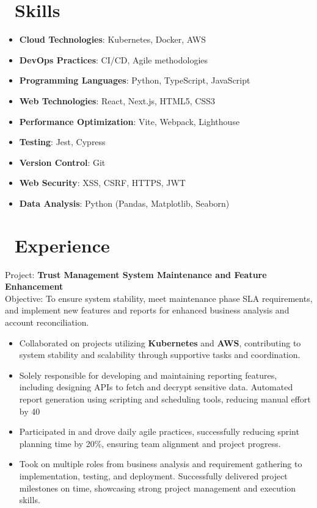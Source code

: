 \documentclass{resume}
\begin{document}
\onehalfspacing
{}



\section{\faCogs\ Skills}
\begin{itemize}[parsep=0.5ex]
  \item \textbf{Cloud Technologies}: Kubernetes, Docker, AWS
  \item \textbf{DevOps Practices}: CI/CD, Agile methodologies
  \item \textbf{Programming Languages}: Python, TypeScript, JavaScript
  \item \textbf{Web Technologies}: React, Next.js, HTML5, CSS3
  \item \textbf{Performance Optimization}: Vite, Webpack, Lighthouse
  \item \textbf{Testing}: Jest, Cypress
  \item \textbf{Version Control}: Git
  \item \textbf{Web Security}: XSS, CSRF, HTTPS, JWT
  \item \textbf{Data Analysis}: Python (Pandas, Matplotlib, Seaborn)
\end{itemize}

\section{\faUsers\ Experience}
\role{Software Developer}

Project: \textbf{Trust Management System Maintenance and Feature Enhancement} \\
Objective: To ensure system stability, meet maintenance phase SLA requirements, and implement new features and reports for enhanced business analysis and account reconciliation.
\begin{itemize}
  \item Collaborated on projects utilizing \textbf{Kubernetes} and \textbf{AWS}, contributing to system stability and scalability through supportive tasks and coordination.
  \item Solely responsible for developing and maintaining reporting features, including designing APIs to fetch and decrypt sensitive data. Automated report generation using scripting and scheduling tools, reducing manual effort by 40%
  \item Participated in and drove daily agile practices, successfully reducing sprint planning time by 20\%, ensuring team alignment and project progress.
  \item Took on multiple roles from business analysis and requirement gathering to implementation, testing, and deployment. Successfully delivered project milestones on time, showcasing strong project management and execution skills.
\end{itemize}
\end{document}
